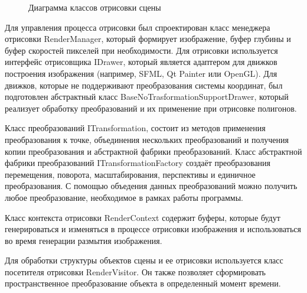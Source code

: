 \begin{figure}[h]
    \centering
    
    \caption{Диаграмма классов отрисовки сцены}
    \label{fig:uml_render}
\end{figure}

Для управления процесса отрисовки был спроектирован класс менеджера отрисовки RenderManager, который формирует изображение, буфер глубины и буфер  скоростей пикселей при необходимости. Для отрисовки используется интерфейс отрисовщика IDrawer, который является адаптером для движков построения изображения (например, SFML, Qt Painter или OpenGL). Для движков, которые не поддерживают преобразования системы координат, был подготовлен абстрактный класс BaseNoTrasformationSupportDrawer, который реализует обработку преобразований и их применение при отрисовке полигонов.  

Класс преобразований ITransformation, состоит из методов применения преобразования к точке, объединения нескольких преобразований и получения копии преобразования и абстрактной фабрики преобразований.
Класс абстрактной фабрики преобразований ITransformationFactory создаёт преобразования перемещения, поворота, масштабирования, перспективы и единичное преобразования. С помощью объедения данных преобразований можно получить любое преобразование, необходимое в рамках работы программы.

Класс контекста отрисовки RenderContext содержит буферы, которые будут генерироваться и изменяться в процессе отрисовки изображения и использоваться во время генерации размытия изображения.

Для обработки структуры объектов сцены и ее отрисовки используется класс посетителя отрисовки RenderVisitor. Он также позволяет сформировать пространственное преобразование объекта в определенный момент времени.


%     



